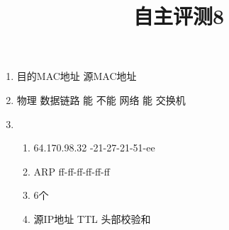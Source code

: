 \documentclass[11pt]{article}
\title{自主评测8}
\date{}
\author{}
\begin{document}
\maketitle

\begin{enumerate}
    \renewcommand{\labelenumii}{(\arabic{enumii})}
    \item 目的MAC地址 \quad 源MAC地址
    \item 物理 \quad 数据链路 \quad 能 \quad 不能 \quad 网络 \quad 能 \quad 交换机
    \item
        \begin{enumerate}
            \item 64.170.98.32 -21-27-21-51-ee
            \item ARP \quad ff-ff-ff-ff-ff-ff
            \item 6个
            \item 源IP地址 \quad TTL \quad 头部校验和
        \end{enumerate}
\end{enumerate}
\end{document}

